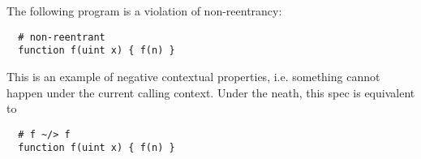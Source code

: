 The following program is a violation of non-reentrancy:

\begin{lstlisting}
  # non-reentrant
  function f(uint x) { f(n) }
\end{lstlisting}

This is an example of negative contextual properties, i.e. something cannot
happen under the current calling context. Under the neath, this spec is
equivalent to

\begin{lstlisting}
  # f ~/> f
  function f(uint x) { f(n) }
\end{lstlisting}

